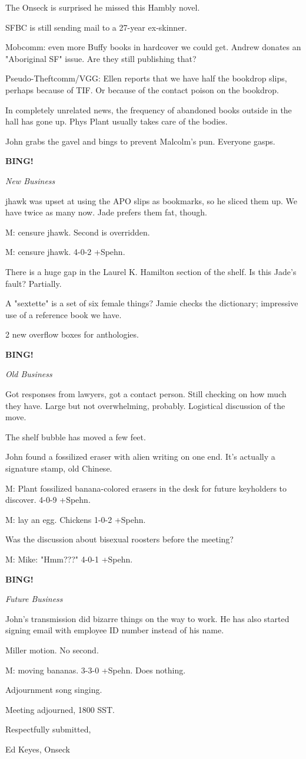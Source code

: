 \documentclass[12pt]{article}
\newcommand{\bing}{{\bf BING!} }
\newcommand{\goto}[1]{\bing \vskip 12pt \centerline{{\em{#1}}}}
\begin{document}
The Onseck is surprised he missed this Hambly novel.

SFBC is still sending mail to a 27-year ex-skinner.

Mobcomm: even more Buffy books in hardcover we could get. Andrew donates an "Aboriginal SF" issue. Are they still publishing that?

Pseudo-Theftcomm/VGG: Ellen reports that we have half the bookdrop slips, perhaps because of TIF. Or because of the contact poison on the bookdrop.

In completely unrelated news, the frequency of abandoned books outside in the hall has gone up. Phys Plant usually takes care of the bodies.

John grabs the gavel and bings to prevent Malcolm's pun. Everyone gasps.

\goto{New Business}

jhawk was upset at using the APO slips as bookmarks, so he sliced them up. We have twice as many now. Jade prefers them fat, though.

M: censure jhawk. Second is overridden.

M: censure jhawk. 4-0-2 +Spehn.

There is a huge gap in the Laurel K. Hamilton section of the shelf. Is this Jade's fault? Partially.

A "sextette" is a set of six female things? Jamie checks the dictionary; impressive use of a reference book we have.

2 new overflow boxes for anthologies.

\goto{Old Business}

Got responses from lawyers, got a contact person. Still checking on how much they have. Large but not overwhelming, probably. Logistical discussion of the move.

The shelf bubble has moved a few feet.

John found a fossilized eraser with alien writing on one end. It's actually a signature stamp, old Chinese.

M: Plant fossilized banana-colored erasers in the desk for future keyholders to discover. 4-0-9 +Spehn.

M: lay an egg. Chickens 1-0-2 +Spehn.

Was the discussion about bisexual roosters before the meeting?

M: Mike: "Hmm???" 4-0-1 +Spehn.

\goto{Future Business}

John's transmission did bizarre things on the way to work. He has also started signing email with employee ID number instead of his name.

Miller motion. No second.

M: moving bananas. 3-3-0 +Spehn. Does nothing.

Adjournment song singing.

\vspace{12pt}

\noindent
Meeting adjourned, 1800 SST.

\vspace{18pt}

\centerline{Respectfully submitted,}
\centerline{Ed Keyes, Onseck}
\end{document}

